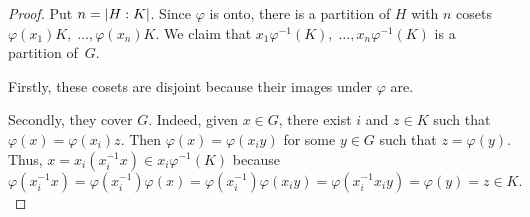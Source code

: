 \begin{proof} Put $n=\left\vert{H:K}\right\vert$. Since $\varphi$ is onto, there is a partition of $H$ with $n$ cosets $\varphi(x_1)K,\;\dots,\varphi(x_n)K$. We claim that $x_1\varphi^{-1}(K),\;\dots,x_n\varphi^{-1}(K)$ is a partition of~$G$.

Firstly, these cosets are disjoint because their images under $\varphi$ are.

Secondly, they cover $G$. Indeed, given $x\in G$, there exist $i$ and $z\in K$ such that $\varphi(x)=\varphi(x_i)z$. Then $\varphi(x)=\varphi(x_iy)$ for some $y\in G$ such that $z=\varphi(y)$. Thus, $x=x_i(x_i^{-1}x)\in x_i\varphi^{-1}(K)$ because 
$$
    \varphi(x_i^{-1}x) =\varphi(x_i^{-1})\varphi(x)
        =\varphi(x_i^{-1})\varphi(x_iy)
        =\varphi(x_i^{-1}x_iy)
        =\varphi(y)=z\in K.
$$
 \end{proof}

